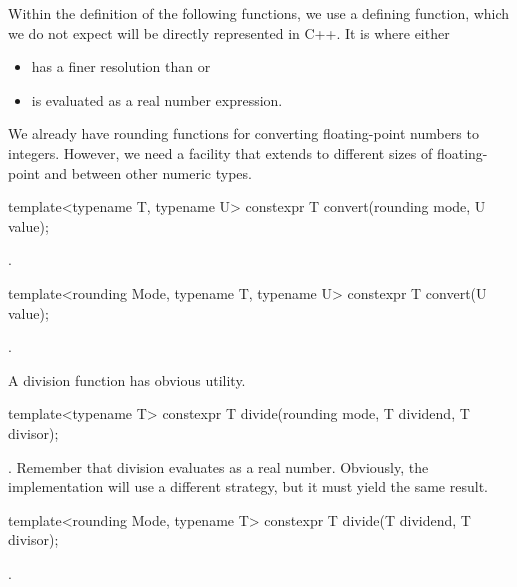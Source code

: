 \begin{addedblock}
Within the definition of the following functions, we use a defining function, which we do not expect will be directly represented in C++. It is  where  either

\begin{itemize}
\item has a finer resolution than  or
\item is evaluated as a real number expression.
\end{itemize}

We already have rounding functions for converting floating-point numbers to integers. However, we need a facility that extends to different sizes of floating-point and between other numeric types.

\begin{itemdecl}
template<typename T, typename U>
constexpr T convert(rounding mode, U value);
\end{itemdecl}

\begin{itemdescr}
\returns {}.
\end{itemdescr}

\begin{itemdecl}
template<rounding Mode, typename T, typename U>
constexpr T convert(U value);
\end{itemdecl}

\begin{itemdescr}
\returns {}.
\end{itemdescr}

A division function has obvious utility.

\begin{itemdecl}
template<typename T>
constexpr T divide(rounding mode, T dividend, T divisor);
\end{itemdecl}

\begin{itemdescr}
\returns {}. Remember that division evaluates as a real number. Obviously, the implementation will use a different strategy, but it must yield the same result.
\end{itemdescr}

\begin{itemdecl}
template<rounding Mode, typename T>
constexpr T divide(T dividend, T divisor);
\end{itemdecl}

\begin{itemdescr}
\returns {}.
\end{itemdescr}


\end{addedblock}

